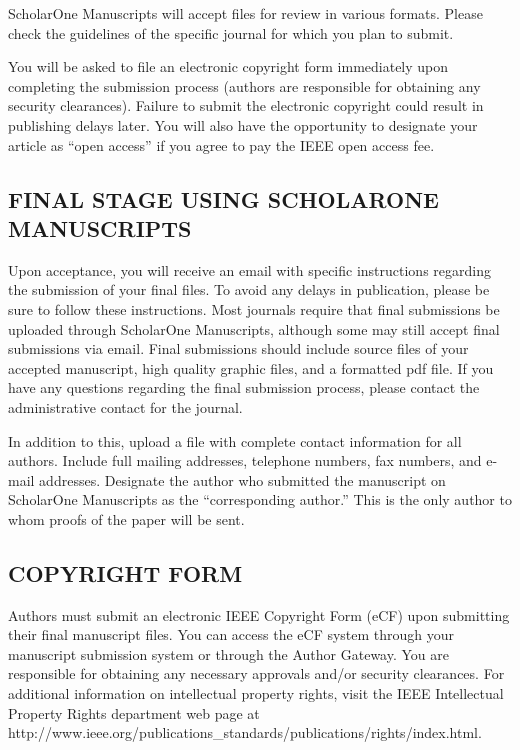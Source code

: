 \documentclass{IEEEojcsys}
\begin{document}
ScholarOne Manuscripts will accept files for review in various formats. Please check the guidelines of the specific journal for which you plan to submit. 

You will be asked to file an electronic copyright form immediately upon completing the submission process (authors are responsible for obtaining any security clearances). Failure to submit the electronic copyright could result in publishing delays later. You will also have the opportunity to designate your article as ``open access'' if you agree to pay the IEEE open access fee. 

\subsection{FINAL STAGE USING SCHOLARONE MANUSCRIPTS}

Upon acceptance, you will receive an email with specific instructions regarding the submission of your final files. To avoid any delays in publication, please be sure to follow these instructions. Most journals require that final submissions be uploaded through ScholarOne Manuscripts, although some may still accept final submissions via email. Final submissions should include source files of your accepted manuscript, high quality graphic files, and a formatted pdf file. If you have any questions regarding the final submission process, please contact the administrative contact for the journal. 

In addition to this, upload a file with complete contact information for all authors. Include full mailing addresses, telephone numbers, fax numbers, and e-mail addresses. Designate the author who submitted the manuscript on ScholarOne Manuscripts as the ``corresponding author.'' This is the only author to whom proofs of the paper will be sent.\vspace*{5pt} 

\subsection{COPYRIGHT FORM}

Authors must submit an electronic IEEE Copyright Form (eCF) upon submitting their final manuscript files. You can access the eCF system through your manuscript submission system or through the Author Gateway. You are responsible for obtaining any necessary approvals and/or security clearances. For additional information on intellectual property rights, visit the IEEE Intellectual Property Rights department web page at http://www.ieee.org/publications\_standards/\break publications/rights/index.html. 
\end{document}
